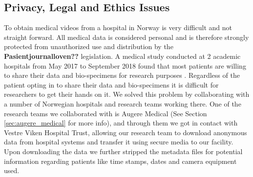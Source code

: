 \documentclass[thesis.tex]{subfiles}
\begin{document}
\subsection{Privacy, Legal and Ethics Issues}
To obtain medical videos from a hospital in Norway is very difficult and not straight forward. All medical data is considered personal and is therefore strongly protected from unauthorized use and distribution by the \textbf{Pasientjournalloven??} legislation.
A medical study conducted at 2 academic hospitals from May 2017 to September 2018 found that most patients are willing to share their data and bio-specimens for research purposes \cite{PatientPerspectives19}. Regardless of the patient opting in to share their data and bio-specimens it is difficult for researchers to get their hands on it. 
We solved this problem by collaborating with a number of Norwegian hospitals and research teams working there. One of the research teams we collaborated with is Augere Medical (See Section \ref{sec:augere_medical} for more info), and through them we got in contact with Vestre Viken Hospital Trust, allowing our research team to download anonymous data from hospital systems and transfer it using secure media to our facility. Upon downloading the data we further stripped the metadata files for potential information regarding patients like time stamps, dates and camera equipment used.

\end{document}
